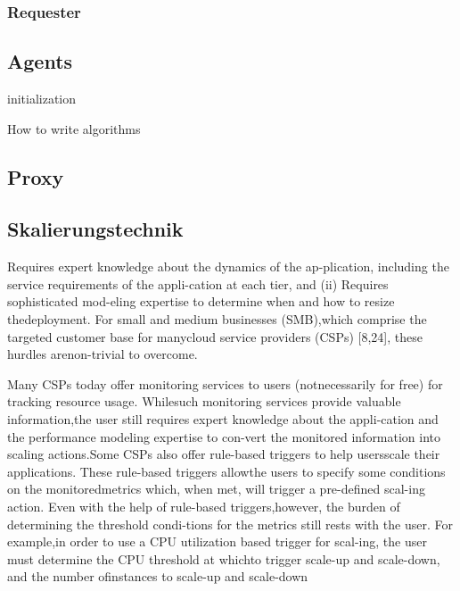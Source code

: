 \documentclass[runningheads]{llncs}
\begin{document}
\subsubsection{Requester}
	
\subsection{Agents}

\begin{algorithm}[H]
	\SetAlgoLined
	initialization\;
	\caption{How to write algorithms}
\end{algorithm}
	
\subsection{Proxy}

\subsection{Skalierungstechnik} \label{skalierungstechnik}

Requires expert knowledge about the dynamics of the ap-plication, including the service requirements of the appli-cation at each tier, and (ii) Requires sophisticated mod-eling expertise to determine when and how to resize thedeployment. For small and medium businesses (SMB),which comprise the targeted customer base for manycloud service providers (CSPs) [8,24], these hurdles arenon-trivial to overcome.

Many CSPs today offer monitoring services to users (notnecessarily for free) for tracking resource usage. Whilesuch monitoring services provide valuable information,the user still requires expert knowledge about the appli-cation and the performance modeling expertise to con-vert the monitored information into scaling actions.Some CSPs also offer rule-based triggers to help usersscale their applications. These rule-based triggers allowthe users to specify some conditions on the monitoredmetrics which, when met, will trigger a pre-defined scal-ing action.  Even with the help of rule-based triggers,however, the burden of determining the threshold condi-tions for the metrics still rests with the user. For example,in order to use a CPU utilization based trigger for scal-ing, the user must determine the CPU threshold at whichto trigger scale-up and scale-down, and the number ofinstances to scale-up and scale-down
\end{document}
